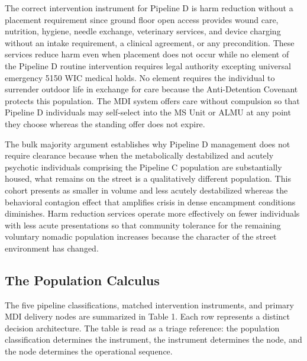\documentclass[12pt, letterpaper]{article}
\begin{document}
The correct intervention instrument for Pipeline D is harm reduction without a placement requirement since ground floor open access provides wound care, nutrition, hygiene, needle exchange, veterinary services, and device charging without an intake requirement, a clinical agreement, or any precondition. These services reduce harm even when placement does not occur while no element of the Pipeline D routine intervention requires legal authority excepting universal emergency 5150 WIC medical holds. No element requires the individual to surrender outdoor life in exchange for care because the Anti-Detention Covenant protects this population. The MDI system offers care without compulsion so that Pipeline D individuals may self-select into the MS Unit or ALMU at any point they choose whereas the standing offer does not expire.

The bulk majority argument establishes why Pipeline D management does not require clearance because when the metabolically destabilized and acutely psychotic individuals comprising the Pipeline C population are substantially housed, what remains on the street is a qualitatively different population. This cohort presents as smaller in volume and less acutely destabilized whereas the behavioral contagion effect that amplifies crisis in dense encampment conditions diminishes. Harm reduction services operate more effectively on fewer individuals with less acute presentations so that community tolerance for the remaining voluntary nomadic population increases because the character of the street environment has changed.

\subsection{The Population Calculus}

The five pipeline classifications, matched intervention instruments, and primary MDI delivery nodes are summarized in Table 1. Each row represents a distinct decision architecture. The table is read as a triage reference: the population classification determines the instrument, the instrument determines the node, and the node determines the operational sequence.
\end{document}
